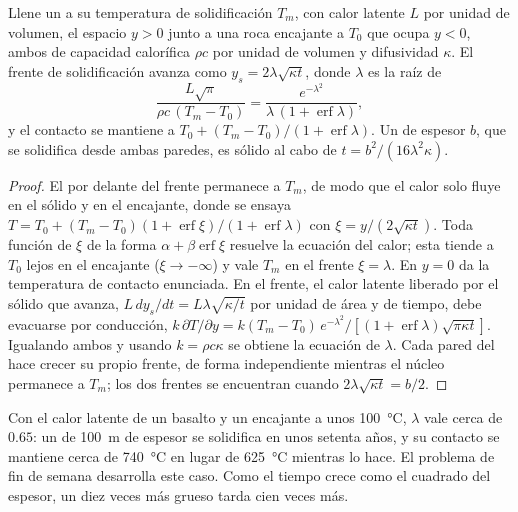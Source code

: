 \begin{proposition}\label{prop:b2:magma-emplacement:stefan}
Llene un  a su temperatura de solidificación $T_m$, con calor latente $L$ por unidad de
volumen, el espacio $y > 0$ junto a una roca encajante a $T_0$ que ocupa $y < 0$, ambos
de capacidad calorífica $\rho c$ por unidad de volumen y difusividad $\kappa$. El
frente de solidificación avanza como $y_s = 2\lambda\sqrt{\kappa t}$, donde $\lambda$
es la raíz de
\[
\frac{L\sqrt\pi}{\rho c\,(T_m - T_0)} = \frac{e^{-\lambda^2}}{\lambda\,(1 + \operatorname{erf}\lambda)},
\]
y el contacto se mantiene a $T_0 + (T_m - T_0)/(1 + \operatorname{erf}\lambda)$. Un 
de espesor $b$, que se solidifica desde ambas paredes, es sólido al cabo de
$t = b^2/(16\lambda^2\kappa)$.
\end{proposition}

\begin{proof}
El  por delante del frente permanece a $T_m$, de modo que el calor solo fluye en el sólido
y en el encajante, donde se ensaya $T = T_0 + (T_m - T_0)(1 + \operatorname{erf}\xi)/(1 +
\operatorname{erf}\lambda)$ con $\xi = y/(2\sqrt{\kappa t})$. Toda función de $\xi$
de la forma $\alpha + \beta\operatorname{erf}\xi$ resuelve la ecuación del calor; esta
tiende a $T_0$ lejos en el encajante ($\xi \to -\infty$) y vale $T_m$ en el frente
$\xi = \lambda$. En $y = 0$ da la temperatura de contacto enunciada. En el frente,
el calor latente liberado por el sólido que avanza, $L\,dy_s/dt = L\lambda\sqrt{\kappa/t}$
por unidad de área y de tiempo, debe evacuarse por conducción, $k\,\partial T/\partial y = k(T_m -
T_0)\,e^{-\lambda^2}/[(1 + \operatorname{erf}\lambda)\sqrt{\pi\kappa t}]$. Igualando ambos
y usando $k = \rho c\kappa$ se obtiene la ecuación de $\lambda$. Cada pared del
 hace crecer su propio frente, de forma independiente mientras el núcleo permanece a $T_m$; los dos
frentes se encuentran cuando $2\lambda\sqrt{\kappa t} = b/2$.
\end{proof}

Con el calor latente de un basalto y un encajante a unos \qty{100}{\celsius},
$\lambda$ vale cerca de $0.65$: un  de \qty{100}{m} de espesor se solidifica en unos
setenta años, y su contacto se mantiene cerca de \qty{740}{\celsius} en lugar de
\qty{625}{\celsius} mientras lo hace. El problema de fin de semana desarrolla este caso.
Como el tiempo crece como el cuadrado del espesor, un  diez veces más grueso
tarda cien veces más.

